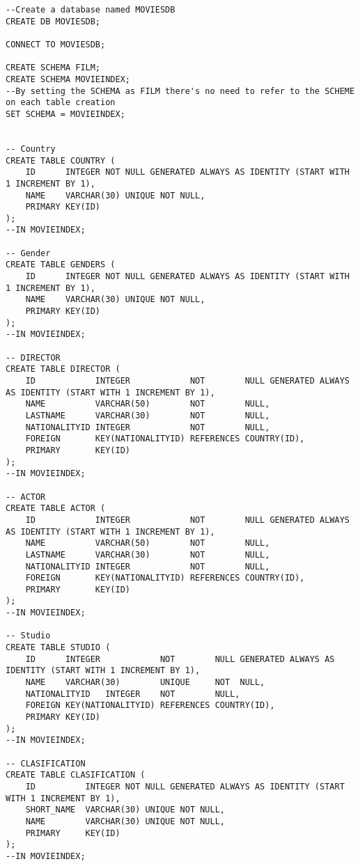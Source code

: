 \documentclass[2pt]{article}
\begin{document}
\begin{verbatim}
--Create a database named MOVIESDB
CREATE DB MOVIESDB;

CONNECT TO MOVIESDB;

CREATE SCHEMA FILM;
CREATE SCHEMA MOVIEINDEX;
--By setting the SCHEMA as FILM there's no need to refer to the SCHEME on each table creation
SET SCHEMA = MOVIEINDEX;


-- Country
CREATE TABLE COUNTRY (
    ID      INTEGER NOT NULL GENERATED ALWAYS AS IDENTITY (START WITH 1 INCREMENT BY 1),
    NAME    VARCHAR(30) UNIQUE NOT NULL,
    PRIMARY KEY(ID)
);
--IN MOVIEINDEX;

-- Gender
CREATE TABLE GENDERS (
    ID      INTEGER NOT NULL GENERATED ALWAYS AS IDENTITY (START WITH 1 INCREMENT BY 1),
    NAME    VARCHAR(30) UNIQUE NOT NULL,
    PRIMARY KEY(ID)
);
--IN MOVIEINDEX;

-- DIRECTOR
CREATE TABLE DIRECTOR (
    ID            INTEGER            NOT        NULL GENERATED ALWAYS AS IDENTITY (START WITH 1 INCREMENT BY 1),
    NAME          VARCHAR(50)        NOT        NULL,
    LASTNAME      VARCHAR(30)        NOT        NULL,
    NATIONALITYID INTEGER            NOT        NULL,
    FOREIGN       KEY(NATIONALITYID) REFERENCES COUNTRY(ID),
    PRIMARY       KEY(ID)
);
--IN MOVIEINDEX;

-- ACTOR
CREATE TABLE ACTOR (
    ID            INTEGER            NOT        NULL GENERATED ALWAYS AS IDENTITY (START WITH 1 INCREMENT BY 1),
    NAME          VARCHAR(50)        NOT        NULL,
    LASTNAME      VARCHAR(30)        NOT        NULL,
    NATIONALITYID INTEGER            NOT        NULL,
    FOREIGN       KEY(NATIONALITYID) REFERENCES COUNTRY(ID),
    PRIMARY       KEY(ID)
);
--IN MOVIEINDEX;

-- Studio
CREATE TABLE STUDIO (
    ID      INTEGER            NOT        NULL GENERATED ALWAYS AS IDENTITY (START WITH 1 INCREMENT BY 1),
    NAME    VARCHAR(30)        UNIQUE     NOT  NULL,
    NATIONALITYID   INTEGER    NOT        NULL, 
    FOREIGN KEY(NATIONALITYID) REFERENCES COUNTRY(ID),
    PRIMARY KEY(ID)
);
--IN MOVIEINDEX;

-- CLASIFICATION
CREATE TABLE CLASIFICATION (
    ID          INTEGER NOT NULL GENERATED ALWAYS AS IDENTITY (START WITH 1 INCREMENT BY 1),
    SHORT_NAME  VARCHAR(30) UNIQUE NOT NULL,
    NAME        VARCHAR(30) UNIQUE NOT NULL,
    PRIMARY     KEY(ID)
);
--IN MOVIEINDEX;



\end{verbatim}
\end{document}

